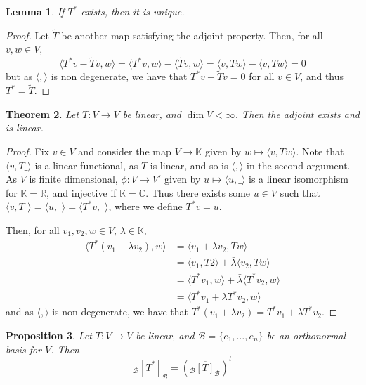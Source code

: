 \documentclass[10pt,fleqn]{article}
\newcommand{\comps}{\mathbb{C}}
\newcommand{\reals}{\mathbb{R}}
\newcommand{\basis}{\mathcal{B}}
\theoremstyle{definition} \newtheorem{defn}{Definition}[section]
\theoremstyle{plain}      \newtheorem{thm}[defn]{Theorem}
\theoremstyle{plain}      \newtheorem{prop}[defn]{Proposition}
\theoremstyle{plain}      \newtheorem{lem}[defn]{Lemma}
\theoremstyle{plain}      \newtheorem{cor}[defn]{Corollary}
\theoremstyle{plain}      \newtheorem{ad}[defn]{Addendum}
\theoremstyle{definition} \newtheorem{ex}[defn]{Example}
\theoremstyle{definition} \newtheorem{rem}[defn]{Remark}
\numberwithin{equation}{subsection}
\begin{document}
\begin{lem}
    If $T^*$ exists, then it is unique.
\end{lem}

\begin{proof}
    Let $\tilde{T}$ be another map satisfying the adjoint property.
    Then, for all $v,w\in V$,
    \[
        \langle T^*v-\tilde{T}v,w\rangle=
        \langle T^*v,w\rangle - \langle \tilde{T}v,w\rangle=
        \langle v,Tw\rangle - \langle v,Tw\rangle=
        0
    \]
    but as $\langle,\rangle$ is non degenerate, we have that $T^*v-\tilde{T}v=0$ for all $v\in V$, and thus $T^*=\tilde{T}$.
\end{proof}

\begin{thm}
    Let $T:V\to V$ be linear, and $\dim V<\infty$.
    Then the adjoint exists and is linear.
\end{thm}

\begin{proof}
    Fix $v\in V$ and consider the map $V\to\mathbb{K}$ given by $w\mapsto\langle v,Tw\rangle$.
    Note that $\langle v,T\_\rangle$ is a linear functional, as $T$ is linear, and so is $\langle,\rangle$ in the second argument.
    As $V$ is finite dimensional, $\phi:V\to V'$ given by $u\mapsto\langle u,\_\rangle$ is a linear isomorphism for $\mathbb{K}=\reals$, and injective if $\mathbb{K}=\comps$.
    Thus there exists some $u\in V$ such that $\langle v,T\_\rangle=\langle u,\_\rangle=\langle T^*v,\_\rangle$, where we define $T^*v=u$.

    Then, for all $v_1,v_2,w\in V$, $\lambda\in\mathbb{K}$,
    \begin{align*}
        \langle T^*(v_1+\lambda v_2),w\rangle
        &=
        \langle v_1+\lambda v_2,Tw\rangle\\
        &=
        \langle v_1,T2\rangle+\bar{\lambda}\langle v_2,Tw\rangle\\
        &=
        \langle T^*v_1,w\rangle+\bar{\lambda}\langle T^*v_2,w\rangle\\
        &=
        \langle T^*v_1+\lambda T^*v_2,w\rangle
    \end{align*}
    and as $\langle,\rangle$ is non degenerate, we have that $T^*(v_1+\lambda v_2)=T^*v_1+\lambda T^*v_2$.
\end{proof}

\begin{prop}
    Let $T:V\to V$ be linear, and $\basis=\{e_1,\ldots,e_n\}$ be an orthonormal basis for $V$.
    Then
    \[
        _{\basis}[T^*]_{\basis}=
        (\overline{_{\basis}[T]_{\basis}})^t
    \]
\end{prop}
\end{document}
